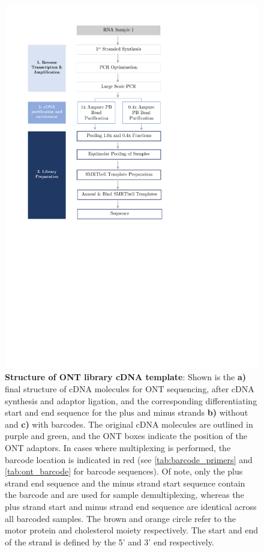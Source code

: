 \begin{figure}[ht]
	\begin{center}
		\includegraphics[page=7,trim={0cm 17cm 0cm 1cm},clip, scale = 0.7]{Figures/ProjectDevelopment_Figures.pdf}
	\end{center}
	\captionsetup{width=0.95\textwidth}
	\caption[Structure of ONT library cDNA template]%
	{\textbf{Structure of ONT library cDNA template}: Shown is the \textbf{a)} final structure of cDNA molecules for ONT sequencing, after cDNA synthesis and adaptor ligation, and the corresponding differentiating start and end sequence for the plus and minus strands \textbf{b)} without and \textbf{c)} with barcodes. The original cDNA molecules are outlined in purple and green, and the ONT boxes indicate the position of the ONT adaptors. In cases where multiplexing is performed, the barcode location is indicated in red (see \cref{tab:barcode_primers} and \cref{tab:ont_barcode} for barcode sequences). Of note, only the plus strand end sequence and the minus strand start sequence contain the barcode and are used for sample demultiplexing, whereas the plus strand start and minus strand end sequence are identical across all barcoded samples. The brown and orange circle refer to the motor protein and cholesterol moiety respectively. The start and end of the strand is defined by the 5' and 3' end respectively. }
	\label{fig:ONT_cdnatemplate}
\end{figure}

